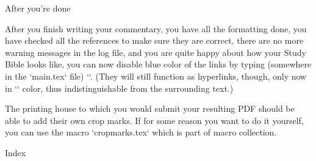 {{\sec After you're done

After you finish writing your commentary, you have all the formatting done, 
you have checked all the references to make sure they are correct, 
there are no more warning messages in the log file, 
and you are quite happy about how your Study Bible looks like, you can now 
disable blue color of the 
links by typing (somewhere in the `main.tex` file) `\hyperlinks\relax\relax`.
(They will still function as hyperlinks, though, only now in `\Black` color, 
thus indistinguishable from the surrounding text.)


The printing house to which you would submit your resulting PDF should be able to add their own 
crop marks. If for some reason you want to do it yourself, you can use the macro `cropmarks.tex` which is part of  macro collection.

\vfill
\eject

\sec Index

\def\_sortinglang{en}
\typosize[9/]
\makeindex
\endmulti

\bye












































































}}
